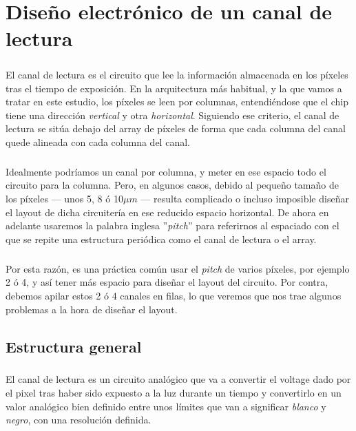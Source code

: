 \chapter{Diseño electrónico de un canal de lectura}\label{cap:ro_sch}

\paragraph{}
El canal de lectura es el circuito que lee la información almacenada en los píxeles
tras el tiempo de exposición.
En la arquitectura más habitual, y la que vamos a tratar en este estudio, los
píxeles se leen por columnas, entendiéndose que el chip tiene una dirección
\textit{vertical} y otra \textit{horizontal}. Siguiendo ese criterio, el canal de lectura se
sitúa debajo del array de píxeles de forma que cada columna del canal quede alineada
con cada columna del canal.

\paragraph{}
Idealmente podríamos un canal por columna, y meter en ese espacio todo el circuito
para la columna. Pero, en algunos casos, debido al pequeño tamaño de los píxeles
--- unos 5, 8 ó 10\(\mu m\) --- resulta complicado o incluso imposible diseñar el
layout de dicha circuitería en ese reducido espacio horizontal. De ahora en adelante
usaremos la palabra inglesa ''\textit{pitch}'' para referirnos al espaciado con el
que se repite una estructura periódica como el canal de lectura o el array.

\paragraph{}
Por esta razón, es una práctica común usar el \textit{pitch} de varios píxeles, por
ejemplo 2 ó 4, y así tener más espacio para diseñar el layout del circuito. Por contra,
debemos apilar estos 2 ó 4 canales en filas, lo que veremos que nos trae algunos
problemas a la hora de diseñar el layout.

\section{Estructura general}\label{cap:ro_sch_estructura}

\paragraph{}
El canal de lectura es un circuito analógico que va a convertir el voltage
dado por el pixel tras haber sido expuesto a la luz durante un tiempo y
convertirlo en un valor analógico bien definido entre unos límites que van a
significar \textit{blanco} y \textit{negro}, con una resolución definida.

